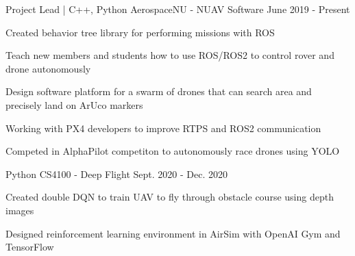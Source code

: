 
\begin{cventries}
  \cventry
    {Project Lead | C++, Python} %
    {AerospaceNU - NUAV Software} %
    {} %
    {June 2019 - Present} %
    {
      \begin{cvitems} %
        \item {Created behavior tree library for performing missions with ROS}
        \item {Teach new members and students how to use ROS/ROS2 to control rover and drone autonomously}
        \item {Design software platform for a swarm of drones that can search area and precisely land on ArUco markers}
        \item {Working with PX4 developers to improve RTPS and ROS2 communication}
        \item {Competed in AlphaPilot competiton to autonomously race drones using YOLO}
      \end{cvitems}
    }

  \cventry
    {Python} %
    {CS4100 - Deep Flight} %
    {} %
    {Sept. 2020 - Dec. 2020} %
    {
      \begin{cvitems} %
        \item {Created double DQN to train UAV to fly through obstacle course using depth images}
        \item {Designed reinforcement learning environment in AirSim with OpenAI Gym and TensorFlow}
      \end{cvitems}
    }
\end{cventries}

